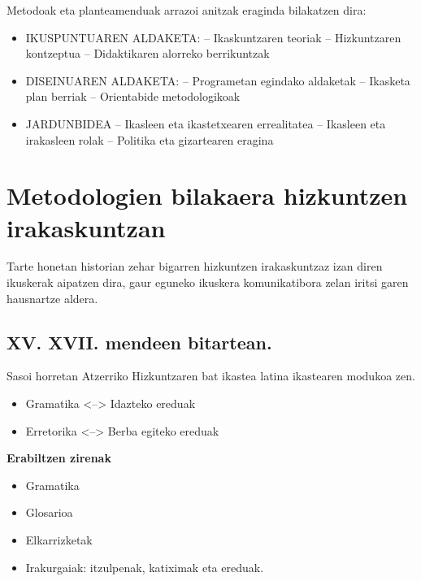 \documentclass[
]{book}
\providecommand{\tightlist}{%
  \setlength{\itemsep}{0pt}\setlength{\parskip}{0pt}}
\begin{document}
Metodoak eta planteamenduak arrazoi anitzak eraginda bilakatzen dira:

\begin{itemize}
\item
  IKUSPUNTUAREN ALDAKETA:
  -- Ikaskuntzaren teoriak
  -- Hizkuntzaren kontzeptua
  -- Didaktikaren alorreko berrikuntzak
\item
  DISEINUAREN ALDAKETA:
  -- Programetan egindako aldaketak
  -- Ikasketa plan berriak
  -- Orientabide metodologikoak
\item
  JARDUNBIDEA
  -- Ikasleen eta ikastetxearen errealitatea
  -- Ikasleen eta irakasleen rolak
  -- Politika eta gizartearen eragina
\end{itemize}

\hypertarget{metodologien-bilakaera-hizkuntzen-irakaskuntzan}{%
\section{Metodologien bilakaera hizkuntzen irakaskuntzan}\label{metodologien-bilakaera-hizkuntzen-irakaskuntzan}}

Tarte honetan historian zehar bigarren hizkuntzen irakaskuntzaz izan diren ikuskerak aipatzen dira, gaur eguneko ikuskera komunikatibora zelan iritsi garen hausnartze aldera.

\hypertarget{xv.-xvii.-mendeen-bitartean.}{%
\subsection{XV. XVII. mendeen bitartean.}\label{xv.-xvii.-mendeen-bitartean.}}

Sasoi horretan Atzerriko Hizkuntzaren bat ikastea latina ikastearen modukoa zen.

\begin{itemize}
\tightlist
\item
  Gramatika \textless--\textgreater{} Idazteko ereduak
\item
  Erretorika \textless--\textgreater{} Berba egiteko ereduak
\end{itemize}

\textbf{Erabiltzen zirenak}

\begin{itemize}
\tightlist
\item
  Gramatika
\item
  Glosarioa
\item
  Elkarrizketak
\item
  Irakurgaiak: itzulpenak, katiximak eta ereduak.
\end{itemize}
\end{document}
